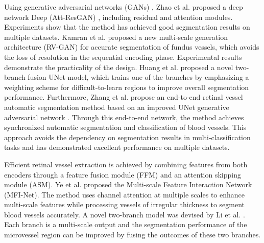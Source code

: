 \documentclass[a4paper,fleqn]{cas-dc}
\begin{document}
Using generative adversarial networks (GANs) \cite {Goodfellow2014GenerativeAN}, Zhao et al. proposed a deep network Deep (Att-ResGAN) \cite{Zhao2021DeepAA}, including residual and attention modules. Experiments show that the method has achieved good segmentation results on multiple datasets. Kamran et al. \cite{Kamran2021RVGANSR} proposed a new multi-scale generation architecture (RV-GAN) for accurate segmentation of fundus vessels, which avoids the loss of resolution in the sequential encoding phase. Experimental results demonstrate the practicality of the design. Huang et al. \cite{Huang2022DBFUNetDB} proposed a novel two-branch fusion UNet model, which trains one of the branches by emphasizing a weighting scheme for difficult-to-learn regions to improve overall segmentation performance. Furthermore, Zhang et al. propose an end-to-end retinal vessel automatic segmentation method based on an improved UNet generative adversarial network \cite{Zhang2023EndtoEndAC}. Through this end-to-end network, the method achieves synchronized automatic segmentation and classification of blood vessels. This approach avoids the dependency on segmentation results in multi-classification tasks and has demonstrated excellent performance on multiple datasets.

Efficient retinal vessel extraction is achieved by combining features from both encoders through a feature fusion module (FFM) and an attention skipping module (ASM). Ye et al. \cite{Ye2022MFINetMF} proposed the Multi-scale Feature Interaction Network (MFI-Net). The method uses channel attention at multiple scales to enhance multi-scale features while processing vessels of irregular thickness to segment blood vessels accurately. A novel two-branch model was devised by Li et al. \cite{Li2022AND}. Each branch is a multi-scale output and the segmentation performance of the microvessel region can be improved by fusing the outcomes of these two branches.   
\end{document}
